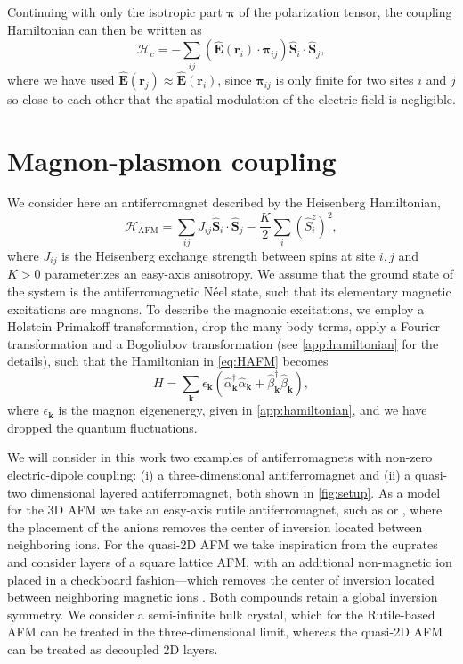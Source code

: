 \documentclass[aps,prb,reprint,twocolumns,superscriptaddress,nofootinbib]{revtex4-2}
\begin{document}
	Continuing with only the isotropic part $\bm \pi$ of the polarization tensor, the coupling Hamiltonian can then be written as
	\begin{equation}
		\mathcal H_c = -\sum_{ij} (\hat{\bm E}(\bm r_i) \cdot \bm\pi_{ij}) \hat{\bm S}_i \cdot \hat{\bm S}_j, \label{eq:Hc-pi}
	\end{equation}
	where we have used $\hat{\bm E}(\bm r_j) \approx \hat{\bm E}(\bm r_i)$, since $\bm\pi_{ij}$ is only finite for two sites $i$ and $j$ so close to each other that the spatial modulation of the electric field is negligible.


	
	
	
	
	\section{Magnon-plasmon coupling}
	\label{sec:method}
	We consider here an antiferromagnet described by the Heisenberg Hamiltonian,
	\begin{equation}
		\mathcal H_{\mathrm{AFM}} = \sum_{ij}J_{ij}\hat{ \bm S}_i \cdot \hat{ \bm S}_j - \frac{K}{2}\sum_i (\hat S^z_i)^2, \label{eq:HAFM}
	\end{equation}
	where $J_{ij}$ is the Heisenberg exchange strength between spins at site $i,j$ and $K>0$ parameterizes an easy-axis anisotropy. We assume that the ground state of the system is the antiferromagnetic Néel state, such that its elementary magnetic excitations are magnons. To describe the magnonic excitations, we employ a Holstein-Primakoff transformation, drop the many-body terms, apply a Fourier transformation and
	a Bogoliubov transformation (see \cref{app:hamiltonian} for the details), such that the Hamiltonian in \cref{eq:HAFM} becomes 
	\begin{equation}
		H=\sum_{\bm k} \epsilon_{\bm k} \left(  \hat \alpha_{\bm k}^\dagger \hat \alpha_{\bm k} + \hat\beta_{\bm k}^\dagger \hat\beta_{\bm k} \right),
	\end{equation}
	where $\epsilon_{\bm k}$ is the magnon eigenenergy, given in \cref{app:hamiltonian}, and we have dropped the quantum fluctuations.

	We will consider in this work two examples of antiferromagnets with non-zero electric-dipole coupling: (i) a  three-dimensional antiferromagnet and (ii) a quasi-two dimensional layered antiferromagnet, both shown in \cref{fig:setup}. As a model for the 3D AFM we take an easy-axis rutile antiferromagnet, such as  or , where the placement of the anions removes the center of inversion located between neighboring ions. For the quasi-2D AFM we take inspiration from the cuprates and consider layers of a square lattice AFM, with an additional non-magnetic ion placed in a checkboard fashion---which removes the center of inversion located between neighboring magnetic ions \cite{shanDynamicMagneticPhase2024}. Both compounds retain a global inversion symmetry. 	
	We consider a semi-infinite bulk crystal, which for the Rutile-based AFM can be treated in the three-dimensional limit, whereas the quasi-2D AFM can be treated as decoupled 2D layers. 
\end{document}

